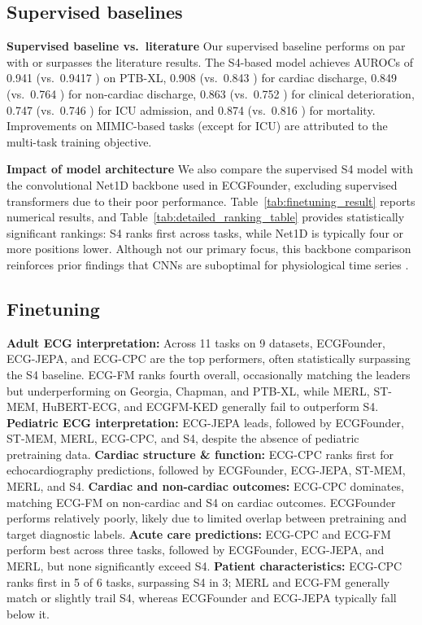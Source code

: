 \documentclass{article}
\newcommand{\heading}[1]{\noindent\textbf{#1}}
\begin{document}
        \subsection{Supervised baselines}
        \heading{Supervised baseline vs.\ literature} Our supervised baseline performs on par with or surpasses the literature results. The S4-based model achieves AUROCs of 0.941 (vs.\ 0.9417 \citep{mehari2023towards}) on PTB-XL, 0.908 (vs.\ 0.843 \citep{Strodthoff2024}) for cardiac discharge, 0.849 (vs.\ 0.764 \citep{Strodthoff2024}) for non-cardiac discharge, 0.863 (vs.\ 0.752 \citep{Alcaraz2025mdsed}) for clinical deterioration, 0.747 (vs.\ 0.746 \citep{Alcaraz2025mdsed}) for ICU admission, and 0.874 (vs.\ 0.816 \citep{Alcaraz2025mdsed}) for mortality. Improvements on MIMIC-based tasks (except for ICU) are attributed to the multi-task training objective.
        
        \heading{Impact of model architecture} We also compare the supervised S4 model with the convolutional Net1D backbone used in ECGFounder, excluding supervised transformers due to their poor performance. Table~\ref{tab:finetuning_result} reports numerical results, and Table~\ref{tab:detailed_ranking_table} provides statistically significant rankings: S4 ranks first across tasks, while Net1D is typically four or more positions lower. Although not our primary focus, this backbone comparison reinforces prior findings that CNNs are suboptimal for physiological time series \citep{Strodthoff2024}.


        \subsection{Finetuning}
        \textbf{Adult ECG interpretation:} Across 11 tasks on 9 datasets, ECGFounder, ECG-JEPA, and ECG-CPC are the top performers, often statistically surpassing the S4 baseline. ECG-FM ranks fourth overall, occasionally matching the leaders but underperforming on Georgia, Chapman, and PTB-XL, while MERL, ST-MEM, HuBERT-ECG, and ECGFM-KED generally fail to outperform S4. \textbf{Pediatric ECG interpretation:} ECG-JEPA leads, followed by ECGFounder, ST-MEM, MERL, ECG-CPC, and S4, despite the absence of pediatric pretraining data. \textbf{Cardiac structure \& function:} ECG-CPC ranks first for echocardiography predictions, followed by ECGFounder, ECG-JEPA, ST-MEM, MERL, and S4. \textbf{Cardiac and non-cardiac outcomes:} ECG-CPC dominates, matching ECG-FM on non-cardiac and S4 on cardiac outcomes. ECGFounder performs relatively poorly, likely due to limited overlap between pretraining and target diagnostic labels. \textbf{Acute care predictions:} ECG-CPC and ECG-FM perform best across three tasks, followed by ECGFounder, ECG-JEPA, and MERL, but none significantly exceed S4. \textbf{Patient characteristics:} ECG-CPC ranks first in 5 of 6 tasks, surpassing S4 in 3; MERL and ECG-FM generally match or slightly trail S4, whereas ECGFounder and ECG-JEPA typically fall below it.
\end{document}
